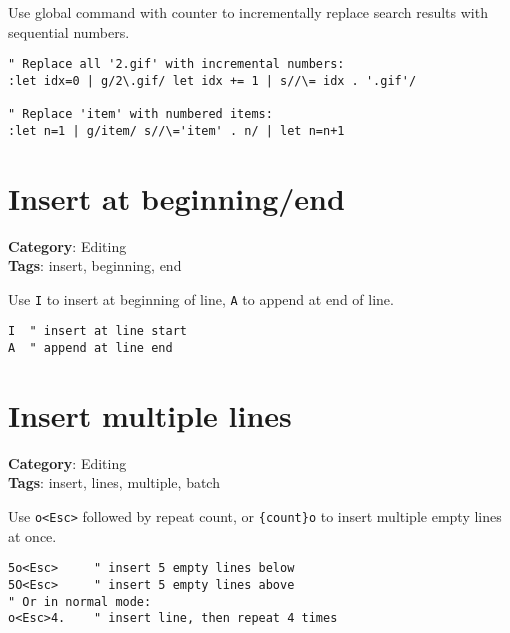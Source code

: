 {{{{{Use global command with counter to incrementally replace search results with sequential numbers.

\begin{Exa*}{}
\begin{Verbatim}[fontsize=\footnotesize, breaklines, breakanywhere]
" Replace all '2.gif' with incremental numbers:
:let idx=0 | g/2\.gif/ let idx += 1 | s//\= idx . '.gif'/

" Replace 'item' with numbered items:
:let n=1 | g/item/ s//\='item' . n/ | let n=n+1
\end{Verbatim}
\end{Exa*}

\section{Insert at beginning/end}

\textbf{Category}: Editing\\ \textbf{Tags}: insert, beginning, end
\vspace{0.5cm}

Use {\footnotesize \Verb§I§} to insert at beginning of line, {\footnotesize \Verb§A§} to append at end of line.

\begin{Exa*}{}
\begin{Verbatim}[fontsize=\footnotesize, breaklines, breakanywhere]
I  " insert at line start
A  " append at line end
\end{Verbatim}
\end{Exa*}

\section{Insert multiple lines}

\textbf{Category}: Editing\\ \textbf{Tags}: insert, lines, multiple, batch
\vspace{0.5cm}

Use {\footnotesize \Verb§o<Esc>§} followed by repeat count, or {\footnotesize \Verb§{count}o§} to insert multiple empty lines at once.

\begin{Exa*}{}
\begin{Verbatim}[fontsize=\footnotesize, breaklines, breakanywhere]
5o<Esc>     " insert 5 empty lines below
5O<Esc>     " insert 5 empty lines above
" Or in normal mode:
o<Esc>4.    " insert line, then repeat 4 times
\end{Verbatim}
\end{Exa*}

}}}}}
